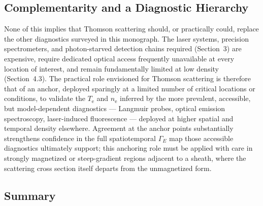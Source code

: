 \subsection{Complementarity and a Diagnostic Hierarchy}

None of this implies that Thomson scattering should, or practically could, replace the other diagnostics surveyed in this monograph. The laser systems, precision spectrometers, and photon-starved detection chains required (Section~3) are expensive, require dedicated optical access frequently unavailable at every location of interest, and remain fundamentally limited at low density (Section~4.3). The practical role envisioned for Thomson scattering is therefore that of an anchor, deployed sparingly at a limited number of critical locations or conditions, to validate the $T_{\mathrm{e}}$ and $n_{\mathrm{e}}$ inferred by the more prevalent, accessible, but model-dependent diagnostics — Langmuir probes, optical emission spectroscopy, laser-induced fluorescence — deployed at higher spatial and temporal density elsewhere. Agreement at the anchor points substantially strengthens confidence in the full spatiotemporal $\Gamma_{E}$ map those accessible diagnostics ultimately support; this anchoring role must be applied with care in strongly magnetized or steep-gradient regions adjacent to a sheath, where the scattering cross section itself departs from the unmagnetized form.

\subsection*{Summary}

